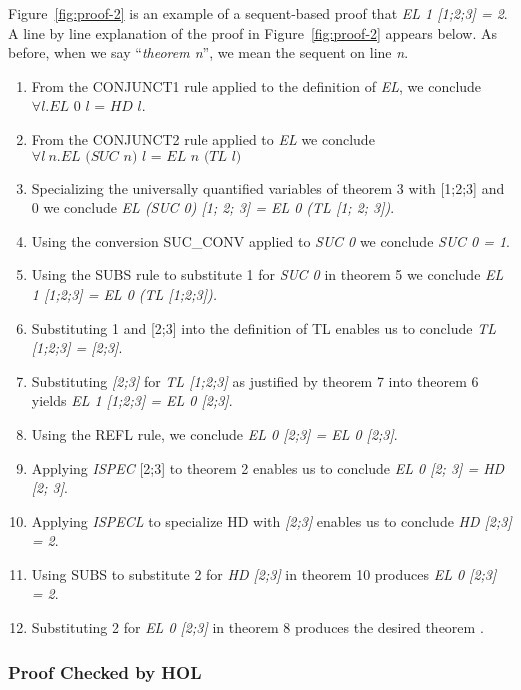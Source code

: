 Figure~\ref{fig:proof-2} is an example of a sequent-based proof that
\emph{EL 1 [1;2;3] = 2}. A line by line explanation of the proof in
Figure~\ref{fig:proof-2} appears below.  As before, when we say
``\emph{theorem n}'', we mean the sequent on line \emph{n}.
\begin{enumerate}
\item From the CONJUNCT1 rule applied to the definition of \emph{EL},
  we conclude $\forall l.\textit{EL 0 l = HD l}$.
\item From the CONJUNCT2 rule applied to \emph{EL} we conclude
  $\forall l \:n.\textit{EL (SUC n) l = EL n (TL l)}$
\item Specializing the universally quantified variables of theorem 3
  with [1;2;3] and 0 we conclude \emph{EL (SUC 0) [1; 2; 3] = EL 0 (TL
    [1; 2; 3])}.
\item Using the conversion SUC\_CONV applied to \emph{SUC 0} we
  conclude \emph{SUC 0 = 1}.
\item Using the SUBS rule to substitute 1 for \emph{SUC 0} in theorem
  5 we conclude \emph{EL 1 [1;2;3] = EL 0 (TL [1;2;3]).}
\item Substituting 1 and [2;3] into the definition of TL enables us to
  conclude \emph{TL [1;2;3] = [2;3]}.
\item Substituting \emph{[2;3]} for \emph{TL [1;2;3]} as justified by
  theorem 7 into theorem 6 yields \emph{EL 1 [1;2;3] = EL 0 [2;3]}.
\item Using the REFL rule, we conclude \emph{EL 0 [2;3] = EL 0 [2;3]}.
\item Applying \emph{ISPEC} [2;3] to theorem 2 enables us to conclude
  \emph{EL 0 [2; 3] = HD [2; 3]}.
\item Applying \emph{ISPECL} to specialize HD with \emph{[2;3]}
  enables us to conclude \emph{HD [2;3] = 2}.
\item Using SUBS to substitute 2 for \emph{HD [2;3]} in theorem 10
  produces \emph{EL 0 [2;3] = 2}.
\item Substituting 2 for \emph{EL 0 [2;3]} in theorem 8 produces the
  desired theorem .
\end{enumerate}


\subsubsection{Proof Checked by HOL}

